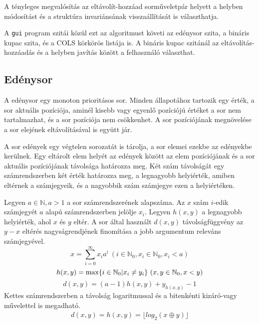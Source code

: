A tényleges megvalósítás az eltávolít-hozzáad sorműveletpár helyett a helyben módosítást és a struktúra invariánsának visszaállítását is választhatja.

A \texttt{gui} program szitái közül ezt az algoritmust követi az edénysor szita, a bináris kupac szita, és a COLS körkörös listája is. A bináris kupac szitánál az eltávolítás-hozzáadás és a helyben javítás között a felhasználó választhat.

\subsection{Edénysor}

A edénysor egy monoton prioritásos sor.
Minden állapotához tartozik egy érték, a sor aktuális pozíciója, aminél kisebb vagy egyenlő pozíciójú értéket a sor nem tartalmazhat, és a sor pozíciója nem csökkenhet.
A sor pozíciójának megnövelése a sor elejének eltávolításával is együtt jár.

A sor edények egy végtelen sorozatát is tárolja, a sor elemei ezekbe az edényekbe kerülnek.
Egy eltárolt elem helyét az edények között az elem pozíciójának és a sor aktuális pozíciójának távolsága határozza meg.
Két szám távolságát egy számrendszerben két érték határozza meg, a legnagyobb helyiérték, amiben eltérnek a számjegyeik, és a nagyobbik szám számjegye ezen a helyiértéken.

Legyen $a \in \mathbb{N}, a > 1$ a sor számrendszerének alapszáma.
Az $x$ szám $i$-edik számjegyét $a$ alapú számrendszerben jelölje $x_i$.
Legyen $h(x, y)$ a legnagyobb helyiérték, ahol $x$ és $y$ eltér.
A sor által használt $d(x, y)$ távolságfüggvény az $y-x$ eltérés nagyságrendjének finomítása a jobb argumentum releváns számjegyével.
\begin{equation}
x = \sum_{i=0}^{\infty} x_i a^i\ (i \in \mathbb{N}_0, x_i \in \mathbb{N}_0, x_i < a)
\end{equation}
\begin{equation}
\label{hdef}
h(x, y) = \max \lbrace i \in \mathbb{N}_0 | x_i \not= y_i\rbrace \ (x, y \in \mathbb{N}_0, x<y)\\
\end{equation}
\begin{equation}
\label{ddef}
d(x, y) = (a-1) h(x, y) + y_{h(x, y)} - 1
\end{equation}
Kettes számrendszerben a távolság logaritmussal és a bitenkénti kizáró-vagy művelettel is megadható.
\begin{align*}
d(x, y) = h(x, y) = \lfloor log_2{(x \oplus y)} \rfloor
\end{align*}

